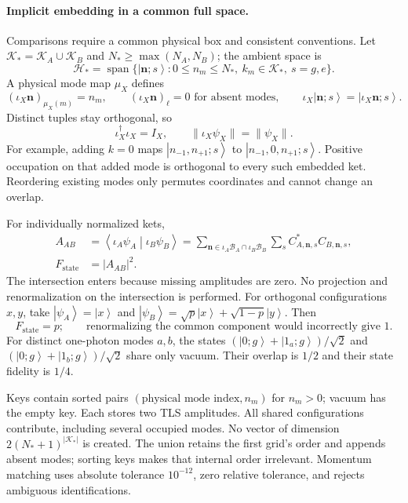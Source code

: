 \documentclass[11pt,a4paper]{article}
\newcommand{\ket}[1]{\left|#1\right\rangle}
\newcommand{\braket}[2]{\left\langle#1\middle|#2\right\rangle}
\newcommand{\B}{\mathcal B}
\newcommand{\K}{\mathcal K}
\begin{document}
\paragraph{Implicit embedding in a common full space.}
Comparisons require a common physical box and consistent conventions.
Let $\K_*=\K_A\cup\K_B$ and $N_*\geq\max(N_A,N_B)$; the ambient space is
\begin{equation}
 \mathcal H_* = \operatorname{span}
 \{\ket{\bm n;s}:0\leq n_m\leq N_*,\ k_m\in\K_*,\ s=g,e\}.
 \label{eq:ambient}
\end{equation}
A physical mode map $\mu_X$ defines
\begin{equation}
 (\iota_X\bm n)_{\mu_X(m)}=n_m,\qquad
 (\iota_X\bm n)_\ell=0\text{ for absent modes},\qquad
 \iota_X\ket{\bm n;s}=\ket{\iota_X\bm n;s}.
\end{equation}
Distinct tuples stay orthogonal, so
\begin{equation}
 \iota_X^\dagger\iota_X=I_X,\qquad
 \|\iota_X\psi_X\|=\|\psi_X\|.
 \label{eq:isometry}
\end{equation}
For example, adding $k=0$ maps $\ket{n_{-1},n_{+1};s}$ to
$\ket{n_{-1},0,n_{+1};s}$. Positive occupation on that added mode is
orthogonal to every such embedded ket. Reordering existing modes only permutes
coordinates and cannot change an overlap.

For individually normalized kets,
\begin{align}
 A_{AB}&=\braket{\iota_A\psi_A}{\iota_B\psi_B}
       =\sum_{\bm n\in\iota_A\B_A\cap\iota_B\B_B}
                       \sum_s C_{A,\bm n,s}^*C_{B,\bm n,s},\\
 F_{\mathrm{state}}&=|A_{AB}|^2.
 \label{eq:fstate}
\end{align}
The intersection enters because missing amplitudes are zero. No projection
and renormalization on the intersection is performed. For orthogonal
configurations $x,y$, take $\ket{\psi_A}=\ket x$ and
$\ket{\psi_B}=\sqrt p\ket x+\sqrt{1-p}\ket y$. Then
\begin{equation}
 F_{\mathrm{state}}=p;
 \qquad\text{renormalizing the common component would incorrectly give }1.
 \label{eq:intersectionexample}
\end{equation}
For distinct one-photon modes $a,b$, the states
$(\ket{0;g}+\ket{1_a;g})/\sqrt2$ and
$(\ket{0;g}+\ket{1_b;g})/\sqrt2$ share only vacuum. Their overlap is $1/2$
and their state fidelity is $1/4$.

Keys contain sorted pairs $(\text{physical mode index},n_m)$ for $n_m>0$;
vacuum has the empty key. Each stores two TLS amplitudes. All shared
configurations contribute, including several occupied modes. No vector of
dimension $2(N_*+1)^{|\K_*|}$ is created. The union retains the first grid's
order and appends absent modes; sorting keys makes that internal order irrelevant.
Momentum matching uses absolute tolerance $10^{-12}$, zero relative tolerance,
and rejects ambiguous identifications.
\end{document}
